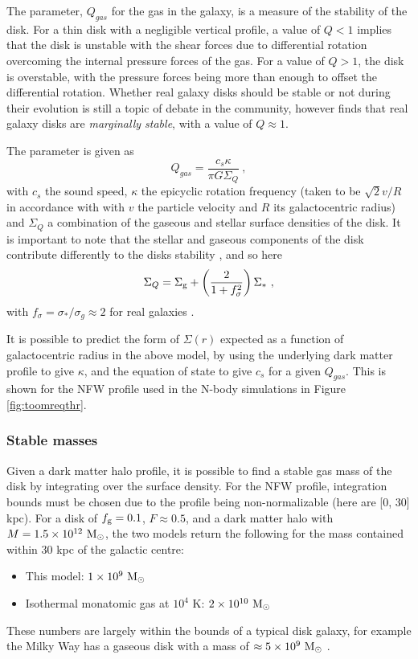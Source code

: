 The \citet{toomre_gravitational_1964} parameter, $Q_{gas}$ for the gas in the galaxy, is a measure of the stability of the disk.
For a thin disk with a negligible vertical profile, a value of $Q<1$ implies that the disk is unstable with the shear forces due to differential rotation overcoming the internal pressure forces of the gas.
For a value of $Q>1$, the disk is overstable, with the pressure forces being more than enough to offset the differential rotation.
Whether real galaxy disks should be stable or not during their evolution is still a topic of debate in the community, however \citet{hopkins_stellar_2012} finds that real galaxy disks are \emph{marginally stable}, with a value of $Q \approx 1$.

The \citet{toomre_gravitational_1964} parameter is given as
\begin{equation}
    Q_{gas} = \frac{c_s \kappa}{\pi G \Sigma_Q}~,
    \label{eqn:Q}
\end{equation}
with $c_s$ the sound speed, $\kappa$ the epicyclic rotation frequency (taken to be $\sqrt{2} v/R$ in accordance with \citet{livermore_resolved_2015} with $v$ the particle velocity and $R$ its galactocentric radius) and $\Sigma_Q$ a combination of the gaseous and stellar surface densities of the disk.
It is important to note that the stellar and gaseous components of the disk contribute differently to the disks stability \citep{rafikov_local_2001}, and so here
\begin{equation}
    \Sigma_Q = \Sigma_\mathrm{g}  + \left(\frac{2}{1 + f_\sigma^2}\right)\Sigma_*~,
    \label{eqn:sgq}
\end{equation}
with $f_\sigma = \sigma_*/\sigma_g \approx 2$ for real galaxies \citep{korchagin_local_2003}.

It is possible to predict the form of $\Sigma(r)$ expected as a function of galactocentric radius in the above model, by using the underlying dark matter profile to give $\kappa$, and the equation of state to give $c_s$ for a given $Q_{gas}$.
This is shown for the NFW profile used in the N-body simulations in Figure \ref{fig:toomreqthr}.

\subsubsection{Stable masses}

Given a dark matter halo profile, it is possible to find a stable gas mass of the disk by integrating over the surface density.
For the NFW profile, integration bounds must be chosen due to the profile being non-normalizable (here are [0, 30] kpc).
For a disk of $f_\mathrm{g}=0.1$, $F \approx 0.5$, and a dark matter halo with $M = 1.5\times10^{12} ~\mathrm{M}_{\odot}$, the two models return the following for the mass contained within 30 kpc of the galactic centre:
\begin{itemize}
    \item This model: $1 \times 10^9 ~\mathrm{M}_{\odot}$
    \item Isothermal monatomic gas at $10^4$ K: $2 \times 10^{10}~\mathrm{M}_{\odot}$
\end{itemize}
These numbers are largely within the bounds of a typical disk galaxy, for example the Milky Way has a gaseous disk with a mass of $\approx 5\times10^9 ~\mathrm{M}_{\odot}$ \citep{licquia_improved_2013}.

